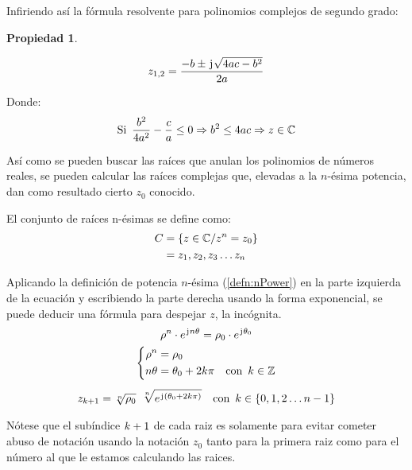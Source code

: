\documentclass[a5paper,12pt,twoside]{book}
\newtheorem{prop}{{Propiedad}}[chapter]
\begin{document}
Infiriendo así la fórmula resolvente para polinomios complejos de segundo grado:

\begin{mdframed}[style=PropertyFrame]
    \begin{prop}
    \end{prop}
    \begin{equation*}
        z_{1,2} = \frac{-b \pm \mkern2mu\mathrm{j}\mkern1mu \sqrt{4ac-b^2}}{2a}
    \end{equation*}
\end{mdframed}

Donde:
\begin{equation*}
    \textrm{Si} \enspace \frac{b^2}{4a^2} - \frac{c}{a} \leq 0 \Rightarrow b^2 \leq 4ac \Rightarrow z \in \mathbb{C}
\end{equation*}

Así como se pueden buscar las raíces que anulan los polinomios de números reales, se pueden calcular las raíces complejas que, elevadas a la $n$-ésima potencia, dan como resultado cierto $z_0$ conocido.

El conjunto de raíces n-ésimas se define como:
\begin{align*}
    C &= { \left\{ {z \in \mathbb{C} / z^n=z_0} \right\} }
    \\
    &= z_1,z_2,z_3 \ldots z_n
\end{align*}

Aplicando la definición de potencia $n$-ésima (\ref{defn:nPower}) en la parte izquierda de la ecuación y escribiendo la parte derecha usando la forma exponencial, se puede deducir una fórmula para despejar $z$, la incógnita.
\begin{gather*}
    \rho^n \cdot e^{\mkern2mu\mathrm{j}\mkern1mu n \theta} = \rho_0 \cdot e^{\mkern2mu\mathrm{j}\mkern1mu \theta_0}
    \\
    \left\{
    \begin{aligned}
        \rho^n &= \rho_0
        \\
        n \theta &= \theta_0 + 2k \pi \quad \textrm{con} \enspace k \in \mathbb{Z}
    \end{aligned}
    \right.
    \\[1ex]
    z_{k+1} = \sqrt[n]{\rho_0} \enspace \sqrt[n]{e^{\mkern2mu\mathrm{j}\mkern1mu (\theta_0 + 2 k \pi)}} \quad \textrm{con} \enspace k \in \{0,1,2 \ldots n-1\}
\end{gather*}

Nótese que el subíndice $k+1$ de cada raiz es solamente para evitar cometer abuso de notación usando la notación $z_0$ tanto para la primera raiz como para el número al que le estamos calculando las raices.
\end{document}
